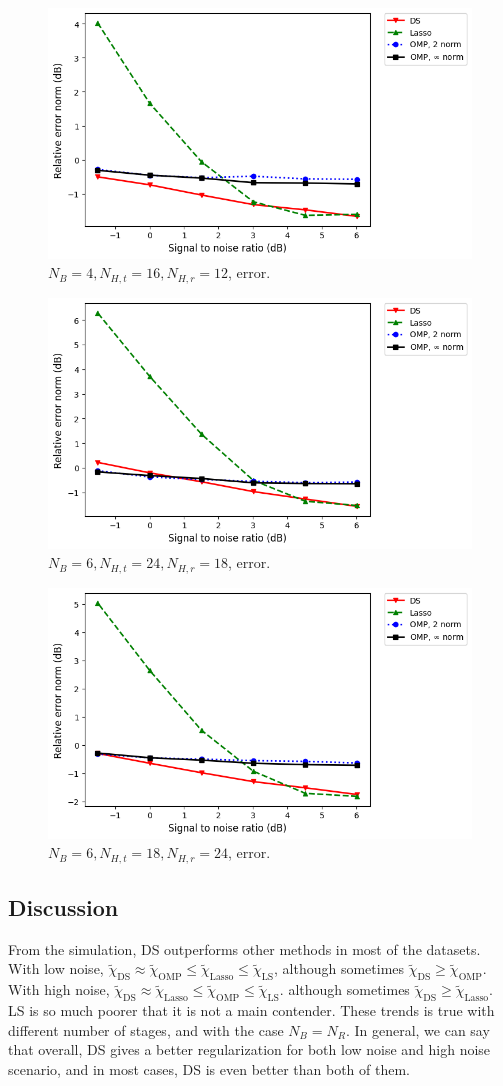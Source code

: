\documentclass[journal]{IEEEtran}
\newcommand {\m} [1] {\( #1 \)}
\begin{document}
{\begin {figure} [H]
\includegraphics [width = 0.45 \textwidth]
{error-medium-more-wide-six-usual.png}
\caption {\m {N_B = 4, N_{H,t} = 16, N_{H,r} = 12}, error.}
\end {figure}

\begin {figure} [H]
\includegraphics [width = 0.45 \textwidth]
{error-big-more-tall-six-usual.png}
\caption {\m {N_B = 6, N_{H,t} = 24, N_{H,r} = 18}, error.}
\end {figure}

\begin {figure} [H]
\includegraphics [width = 0.45 \textwidth]
{error-big-more-wide-six-usual.png}
\caption {\m {N_B = 6, N_{H,t} = 18, N_{H,r} = 24}, error.}
\end {figure}

\subsection {Discussion}

From the simulation, DS outperforms other methods in most of the datasets.
With low noise, \m {\tilde {\chi} _{\mathrm {DS}} \approx \tilde {\chi} _{\mathrm {OMP}} \leq \tilde {\chi} _{\mathrm {Lasso}} \leq \tilde {\chi} _{\mathrm {LS}}},
although sometimes \m {\tilde {\chi} _{\mathrm {DS}} \geq \tilde {\chi} _{\mathrm {OMP}}}.
With high noise, \m {\tilde {\chi} _{\mathrm {DS}} \approx \tilde {\chi} _{\mathrm {Lasso}} \leq \tilde {\chi} _{\mathrm {OMP}} \leq \tilde {\chi} _{\mathrm {LS}}}.
although sometimes \m {\tilde {\chi} _{\mathrm {DS}} \geq \tilde {\chi} _{\mathrm {Lasso}}}.
LS is so much poorer that it is not a main contender.
These trends is true with different number of stages, and with the case \m {N_B = N_R}.
In general, we can say that overall, DS gives a better regularization for both low noise and high noise scenario, and in most cases, DS is even better than both of them.

}
\end{document}
